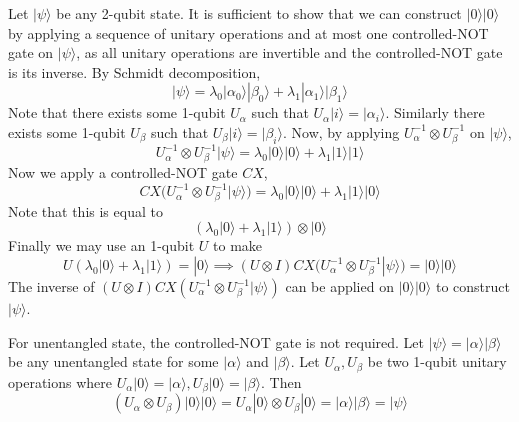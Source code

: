 \begin{enumerate}
\begin{enumerate}
    Let $|\psi \rangle$ be any 2-qubit state. It is sufficient to show that we can construct $|0\rangle |0\rangle$ by applying a sequence of unitary operations and at most one controlled-NOT gate on $|\psi \rangle$, as all unitary operations are invertible and the controlled-NOT gate is its inverse. By Schmidt decomposition,
    \[
    |\psi\rangle = \lambda_0 |\alpha_0\rangle |\beta_0\rangle + \lambda_1 |\alpha_1\rangle |\beta_1\rangle
    \]
    Note that there exists some 1-qubit $U_\alpha$ such that $U_\alpha |i\rangle = |\alpha_i\rangle$. Similarly there exists some 1-qubit $U_\beta$ such that $U_\beta |i\rangle = |\beta_i\rangle$. Now, by applying $U_\alpha^{-1} \otimes U_\beta^{-1}$ on $|\psi\rangle$,
    \[
    U_\alpha^{-1} \otimes U_\beta^{-1} |\psi\rangle = \lambda_0 |0\rangle |0\rangle + \lambda_1 |1\rangle |1\rangle
    \]
    Now we apply a controlled-NOT gate $CX$,
    \[
    CX( U_\alpha^{-1} \otimes U_\beta^{-1} |\psi\rangle ) = \lambda_0 |0\rangle |0\rangle + \lambda_1 |1\rangle |0\rangle
    \]
    Note that this is equal to
    \[
    (\lambda_0 |0\rangle + \lambda_1 |1\rangle) \otimes |0\rangle
    \]
    Finally we may use an 1-qubit $U$ to make
    \[
    U (\lambda_0 |0\rangle + \lambda_1 |1\rangle) = |0\rangle \implies (U\otimes I) CX( U_\alpha^{-1} \otimes U_\beta^{-1} |\psi\rangle ) = |0\rangle |0\rangle
    \]
    The inverse of $(U\otimes I) CX( U_\alpha^{-1} \otimes U_\beta^{-1} |\psi\rangle ) $ can be applied on $|0\rangle |0\rangle$ to construct $|\psi\rangle$.

    For unentangled state, the controlled-NOT gate is not required. Let $|\psi\rangle = |\alpha\rangle |\beta \rangle $ be any unentangled state for some $|\alpha \rangle$ and $|\beta \rangle$. Let $U_\alpha, U_\beta$ be two 1-qubit unitary operations where $U_\alpha |0\rangle = |\alpha\rangle, U_\beta |0\rangle = |\beta\rangle$. Then
    \[
    (U_\alpha \otimes U_\beta) |0\rangle |0\rangle = U_\alpha |0\rangle \otimes U_\beta |0\rangle = |\alpha\rangle |\beta\rangle = |\psi\rangle
    \]
    

\end{enumerate}
\end{enumerate}
